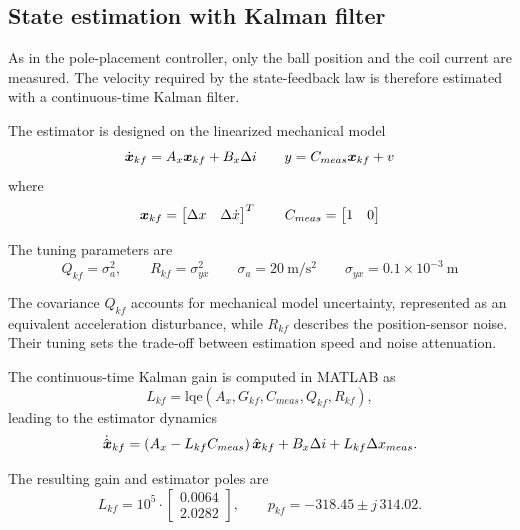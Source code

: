 \subsection{State estimation with Kalman filter}

As in the pole-placement controller, only the ball position and the coil current are measured.
The velocity required by the state-feedback law is therefore estimated with a continuous-time Kalman
filter.

The estimator is designed on the linearized mechanical model
\begin{equation}
    \dot{\boldsymbol{x}}_{kf}
    =
    A_x \boldsymbol{x}_{kf}
    +
    B_x \Delta i
    \qquad
    y = C_{meas}\boldsymbol{x}_{kf} + v
\end{equation}
where
\begin{equation}
    \boldsymbol{x}_{kf}
    =
    \begin{bmatrix}
        \Delta x & \Delta \dot{x}
    \end{bmatrix}^{T}
    \qquad
    C_{meas}
    =
    \begin{bmatrix}
        1 & 0
    \end{bmatrix}
\end{equation}


The tuning parameters are
\begin{equation}
    Q_{kf} = \sigma_a^2,
    \qquad
    R_{kf} = \sigma_{yx}^2
    \qquad
    \sigma_a = 20~\mathrm{m/s^2}
    \qquad
    \sigma_{yx} = 0.1 \times 10^{-3}~\mathrm{m}
\end{equation}

The covariance $Q_{kf}$ accounts for mechanical model uncertainty, represented as an equivalent
acceleration disturbance, while $R_{kf}$ describes the position-sensor noise. Their tuning sets the
trade-off between estimation speed and noise attenuation.

The continuous-time Kalman gain is computed in MATLAB as
\begin{equation}
    L_{kf}
    =
    \mathrm{lqe}(A_x,G_{kf},C_{meas},Q_{kf},R_{kf}),
\end{equation}
leading to the estimator dynamics
\begin{equation}
    \dot{\hat{\boldsymbol{x}}}_{kf}
    =
    \left(A_x - L_{kf}C_{meas}\right)\hat{\boldsymbol{x}}_{kf}
    +
    B_x \Delta i
    +
    L_{kf}\Delta x_{meas}.
\end{equation}

The resulting gain and estimator poles are
\begin{equation}
    L_{kf}
    = 10^{5} \cdot
    \begin{bmatrix}
        0.0064  \\
        2.0282 
    \end{bmatrix},
    \qquad
    p_{kf}
    =
    -318.45 \pm j\,314.02.
\end{equation}

